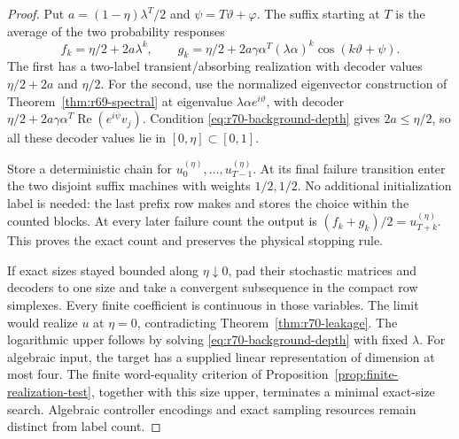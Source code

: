 \begin{proof}
Put $a=(1-\eta)\lambda^T/2$ and $\psi=T\vartheta+\varphi$. The suffix starting at $T$ is the average of the two probability responses
\[
 f_k=\eta/2+2a\lambda^k,\qquad
 g_k=\eta/2+2a\gamma\alpha^T(\lambda\alpha)^k\cos(k\vartheta+\psi).
\]
The first has a two-label transient/absorbing realization with decoder values $\eta/2+2a$ and $\eta/2$. For the second, use the normalized eigenvector construction of Theorem~\ref{thm:r69-spectral} at eigenvalue $\lambda\alpha e^{i\vartheta}$, with decoder $\eta/2+2a\gamma\alpha^T\operatorname{Re}(e^{i\psi}v_j)$. Condition \eqref{eq:r70-background-depth} gives $2a\le\eta/2$, so all these decoder values lie in $[0,\eta]\subset[0,1]$.

Store a deterministic chain for $u_0^{(\eta)},\ldots,u_{T-1}^{(\eta)}$. At its final failure transition enter the two disjoint suffix machines with weights $1/2,1/2$. No additional initialization label is needed: the last prefix row makes and stores the choice within the counted blocks. At every later failure count the output is $(f_k+g_k)/2=u_{T+k}^{(\eta)}$. This proves the exact count and preserves the physical stopping rule.

If exact sizes stayed bounded along $\eta\downarrow0$, pad their stochastic matrices and decoders to one size and take a convergent subsequence in the compact row simplexes. Every finite coefficient is continuous in those variables. The limit would realize $u$ at $\eta=0$, contradicting Theorem~\ref{thm:r70-leakage}. The logarithmic upper follows by solving \eqref{eq:r70-background-depth} with fixed $\lambda$. For algebraic input, the target has a supplied linear representation of dimension at most four. The finite word-equality criterion of Proposition~\ref{prop:finite-realization-test}, together with this size upper, terminates a minimal exact-size search. Algebraic controller encodings and exact sampling resources remain distinct from label count.
\end{proof}
